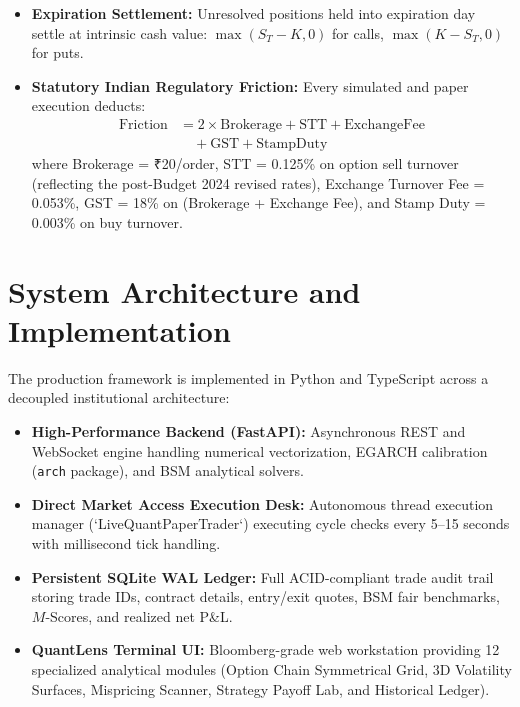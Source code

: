 \documentclass[journal]{IEEEtran}
\begin{document}
\begin{itemize}
    \begin{itemize}
        \item \emph{Short Option (Alpha Harvest):} Take-profit at $P_{\mathrm{tp}} = \min(P_{\mathrm{fair}}, P_{\mathrm{entry}} \times 0.75)$ (25\% premium decay); Stop-loss at $P_{\mathrm{sl}} = P_{\mathrm{entry}} \times 1.10$ (+10\% adverse price expansion).
        \item \emph{Long Option (Discount Vega):} Take-profit at $P_{\mathrm{tp}} = \max(P_{\mathrm{fair}}, P_{\mathrm{entry}} \times 1.25)$; Stop-loss at $P_{\mathrm{sl}} = P_{\mathrm{entry}} \times 0.90$ ($-10\%$ adverse decay).
    \end{itemize}
    \item \textbf{Expiration Settlement:} Unresolved positions held into expiration day settle at intrinsic cash value: $\max(S_T - K, 0)$ for calls, $\max(K - S_T, 0)$ for puts.
    \item \textbf{Statutory Indian Regulatory Friction:} Every simulated and paper execution deducts:
    \begin{equation}
    \begin{aligned}
    \mathrm{Friction} &= 2 \times \mathrm{Brokerage} + \mathrm{STT} + \mathrm{ExchangeFee} \\
    &\quad + \mathrm{GST} + \mathrm{StampDuty}
    \end{aligned}
    \end{equation}
    where Brokerage = ₹20/order, STT = 0.125\% on option sell turnover (reflecting the post-Budget 2024 revised rates), Exchange Turnover Fee = 0.053\%, GST = 18\% on (Brokerage + Exchange Fee), and Stamp Duty = 0.003\% on buy turnover.
\end{itemize}

\section{System Architecture and Implementation}

The production framework is implemented in Python and TypeScript across a decoupled institutional architecture:
\begin{itemize}
    \item \textbf{High-Performance Backend (FastAPI):} Asynchronous REST and WebSocket engine handling numerical vectorization, EGARCH calibration (\texttt{arch} package), and BSM analytical solvers.
    \item \textbf{Direct Market Access Execution Desk:} Autonomous thread execution manager (`LiveQuantPaperTrader`) executing cycle checks every 5--15 seconds with millisecond tick handling.
    \item \textbf{Persistent SQLite WAL Ledger:} Full ACID-compliant trade audit trail storing trade IDs, contract details, entry/exit quotes, BSM fair benchmarks, $M$-Scores, and realized net P\&L.
    \item \textbf{QuantLens Terminal UI:} Bloomberg-grade web workstation providing 12 specialized analytical modules (Option Chain Symmetrical Grid, 3D Volatility Surfaces, Mispricing Scanner, Strategy Payoff Lab, and Historical Ledger).
\end{itemize}
\end{document}
